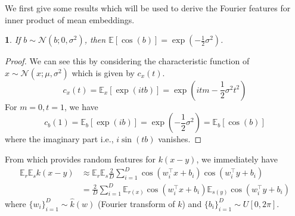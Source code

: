 \documentclass[english]{article}
\theoremstyle{plain}
\theoremstyle{plain}
\newtheorem{lem}[thm]{\protect\lemmaname}
\providecommand{\lemmaname}{Lemma}
\begin{document}
We first give some results which will be used to derive the Fourier
features for inner product of mean embeddings.
\begin{lem}
If $b\sim\mathcal{N}(b;0,\sigma^{2})$, then $\mathbb{E}[\cos(b)]=\exp\left(-\frac{1}{2}\sigma^{2}\right)$.\label{lemma:e_cos}\end{lem}
\begin{proof}
We can see this by considering the characteristic function of $x\sim\mathcal{N}(x;\mu,\sigma^{2})$
which is given by $c_{x}(t)$.
\[
c_{x}(t)=\mathbb{E}_{x}\left[\exp\left(itb\right)\right]=\exp\left(itm-\frac{1}{2}\sigma^{2}t^{2}\right)
\]
For $m=0,t=1$, we have 
\[
c_{b}(1)=\mathbb{E}_{b}\left[\exp(ib)\right]=\exp\left(-\frac{1}{2}\sigma^{2}\right)=\mathbb{E}_{b}\left[\cos(b)\right]
\]
where the imaginary part  i.e., $i\sin(tb)$ vanishes.
\end{proof}
%


From \cite{Rahimi2007} which provides random features for $k(x-y)$,
we immediately have
\begin{align*}
\mathbb{E}_{r}\mathbb{E}_{s}k(x-y) & \approx\mathbb{E}_{r}\mathbb{E}_{s}\frac{2}{D}\sum_{i=1}^{D}\cos\left(w_{i}^{\top}x+b_{i}\right)\cos\left(w_{i}^{\top}y+b_{i}\right)\\
 & =\frac{2}
 {D}\sum_{i=1}^{D}\mathbb{E}_{r(x)}\cos\left(w_{i}^{\top}x+b_{i}\right)\mathbb{E}_{s(y)}\cos\left(w_{i
 }^{\top}y+b_{i}\right)
\end{align*}
where $\{w_{i}\}_{i=1}^{D}\sim\hat{k}(w)$ (Fourier transform of $k$)
and $\{b_{i}\}_{i=1}^{D}\sim U\left[0,2\pi\right]$. 
\end{document}
